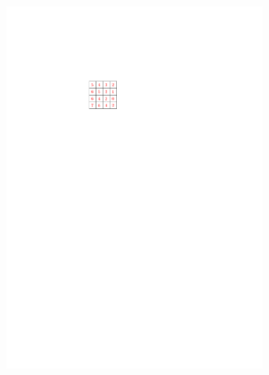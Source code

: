 \documentclass[letterpaper]{article}
\theoremstyle{definition}
\begin{document}
\begin{figure}[t]
\begin{subfigure}[b]{0.12\textwidth}
	\includegraphics[width=0.95\textwidth]{Figs/example1_a1_h_EG.pdf}
    \caption{}
  \end{subfigure}
  \begin{subfigure}[b]{0.12\textwidth}

\end{subfigure}
\end{figure}
\end{document}

